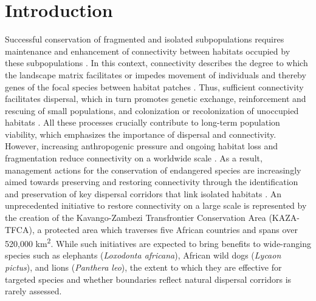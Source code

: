 \documentclass[abstract=on,10pt,a4paper,bibliography=totocnumbered]{scrartcl}
\begin{document}
\onehalfspacing
\tableofcontents
\doublespacing
\newpage


\section{Introduction}
Successful conservation of fragmented and isolated subpopulations requires
maintenance and enhancement of connectivity between habitats occupied by these
subpopulations \citep{Hanski.1998}. In this context, connectivity describes the
degree to which the landscape matrix facilitates or impedes movement of
individuals and thereby genes of the focal species between habitat patches
\citep{Taylor.1993, Clobert.2012}. Thus, sufficient connectivity facilitates
dispersal, which in turn promotes genetic exchange, reinforcement and rescuing
of small populations, and colonization or recolonization of unoccupied habitats
\citep{Brown.1977, Hanski.1998, MacArthur.2001, Frankham.2002, Leigh.2012}. All
these processes crucially contribute to long-term population viability, which
emphasizes the importance of dispersal and connectivity. However, increasing
anthropogenic pressure and ongoing habitat loss and fragmentation reduce
connectivity on a worldwide scale \citep{Fahrig.2003, Barnosky.2012}. As a
result, management actions for the conservation of endangered species are
increasingly aimed towards preserving and restoring connectivity through the
identification and preservation of key dispersal corridors that link isolated
habitats \citep{Fahrig.2003, Heller.2009}. An unprecedented initiative to
restore connectivity on a large scale is represented by the creation of the
Kavango-Zambezi Transfrontier Conservation Area (KAZA-TFCA), a protected area
which traverses five African countries and spans over 520,000
km\textsuperscript{2}. While such initiatives are expected to bring benefits to
wide-ranging species such as elephants (\textit{Loxodonta africana}), African
wild dogs (\textit{Lycaon pictus}), and lions (\textit{Panthera leo}), the
extent to which they are effective for targeted species and whether boundaries
reflect natural dispersal corridors is rarely assessed.
\end{document}
